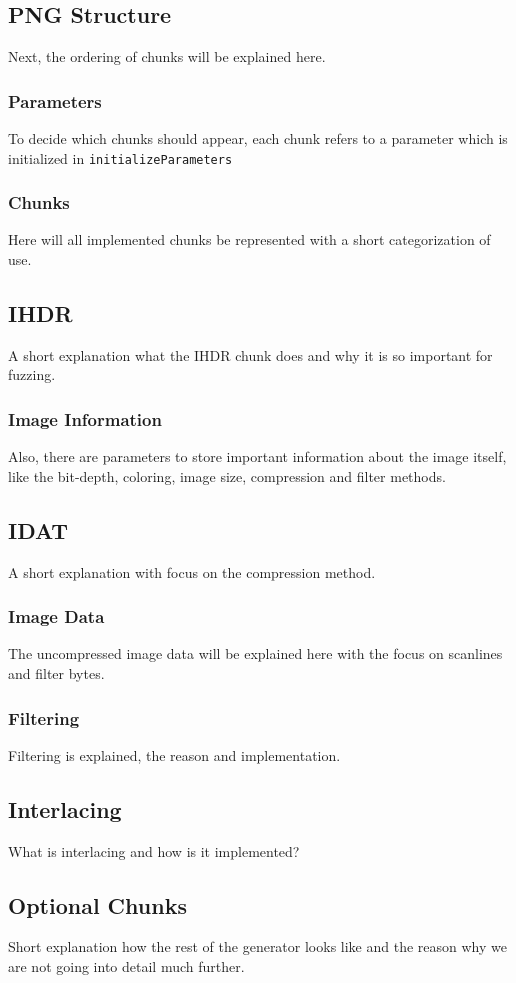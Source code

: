 \documentclass[runningheads]{llncs}
\begin{document}
\subsection{PNG Structure}
Next, the ordering of chunks will be explained here.
\subsubsection{Parameters}
To decide which chunks should appear, each chunk refers to a parameter which is initialized in \texttt{initializeParameters}
\subsubsection{Chunks}
Here will all implemented chunks be represented with a short categorization of use.
\subsection{IHDR}
A short explanation what the IHDR chunk does and why it is so important for fuzzing.
\subsubsection{Image Information}
Also, there are parameters to store important information about the image itself, like the bit-depth, coloring, image size, compression and filter methods. 
\subsection{IDAT}
A short explanation with focus on the compression method.
\subsubsection{Image Data}
The uncompressed image data will be explained here with the focus on scanlines and filter bytes.
\subsubsection{Filtering}
Filtering is explained, the reason and implementation.
\subsection{Interlacing}
What is interlacing and how is it implemented?
\subsection{Optional Chunks}
Short explanation how the rest of the generator looks like and the reason why we are not going into detail much further.
\end{document}
